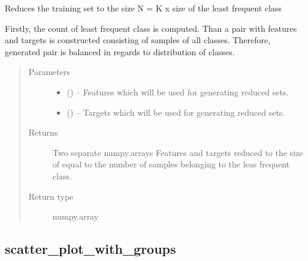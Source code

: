 \documentclass[letterpaper,10pt,english]{sphinxmanual}
\begin{document}
\begin{fulllineitems}
\label{\detokenize{api/ucf.reduce_set_to_equal_distribution_of_classes:ucf.reduce_set_to_equal_distribution_of_classes}}
Reduces the training set to the size N = K x size of the
least frequent class

Firstly, the count of least frequent class is computed. Than a pair
with features and targets is constructed consisting of samples of
all classes. Therefore, generated pair is balanced in regards to
distribution of classes.
\begin{quote}\begin{description}
\item[{Parameters}] \leavevmode\begin{itemize}
\item {} 
 () -- Features which will be used for generating reduced sets.

\item {} 
 () -- Targets which will be used for generating reduced sets.

\end{itemize}

\item[{Returns}] \leavevmode
Two separate numpy.arrays Features and targets reduced to the size of
equal to the number of samples belonging to the leas frequent class.

\item[{Return type}] \leavevmode
numpy.array

\end{description}\end{quote}

\end{fulllineitems}



\subsection{scatter\_plot\_with\_groups}
\label{\detokenize{api/ucf.scatter_plot_with_groups:scatter-plot-with-groups}}\label{\detokenize{api/ucf.scatter_plot_with_groups::doc}}
\end{document}
